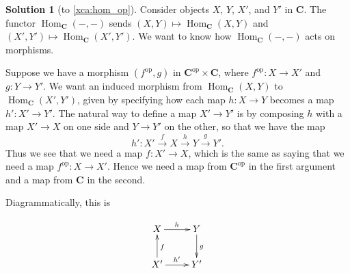 \documentclass{amsart}
\theoremstyle{definition} \newaliasedtheorem{defn}[thm]{Definition}
\theoremstyle{definition} \newtheorem*{defn*}{Definition}
\theoremstyle{definition} \newaliasedtheorem{xca}[thm]{Exercise}
\theoremstyle{definition} \newtheorem*{soln*}{Solution}
\theoremstyle{definition} \newaliasedtheorem{remark}[thm]{Remark}
\theoremstyle{definition} \newtheorem*{remark*}{Remark}
\newcommand{\cat}[1]{\ensuremath{\mathbf{#1}}}
\DeclareMathOperator{\Hom}{Hom}
\begin{document}
    \begin{soln*}[to \autoref{xca:hom_op}] \label{sol:hom_op}
      Consider objects $X$, $Y$, $X'$, and $Y'$ in $\cat C$.  The functor $\Hom_{\cat C}(-, -)$ sends $(X, Y) \mapsto \Hom_{\cat C}(X, Y)$ and $(X', Y') \mapsto \Hom_{\cat C}(X', Y')$.  We want to know how $\Hom_{\cat C}(-, -)$ acts on morphisms.
      
      Suppose we have a morphism $(f^\text{op}, g)$ in $\cat C^\text{op} \times \cat C$, where $f^\text{op} : X \to X'$ and $g : Y \to Y'$.  We want an induced morphism from $\Hom_{\cat C}(X, Y)$ to $\Hom_{\cat C}(X', Y')$, given by specifying how each map $h: X \to Y$ becomes a map $h': X' \to Y'$.  The natural way to define a map $X' \to Y'$ is by composing $h$ with a map $X' \to X$ on one side and $Y \to Y'$ on the other, so that we have the map
      \[
        h' : X' \xrightarrow{f} X \xrightarrow{h} Y \xrightarrow{g} Y'.
      \]
      Thus we see that we need a map $f : X' \to X$, which is the same as saying that we need a map $f^\text{op} : X \to X'$.  Hence we need a map from $\cat C^\text{op}$ in the first argument and a map from $\cat C$ in the second.
      
      Diagrammatically, this is
      
    \[
      \xymatrix{
        X \ar[r]^h & Y \ar[d]^g \\
        X' \ar[u]_{f} \ar[r]^{h'} & Y' \\
      }
    \]
      
    \end{soln*}
    
\end{document}
